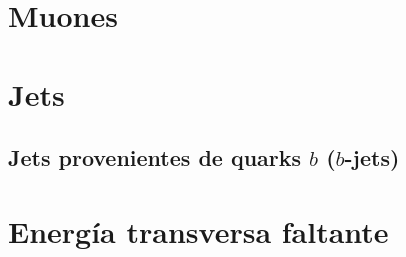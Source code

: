 \section{Muones}

\section{Jets}

\subsection{Jets provenientes de quarks $b$ ($b$-jets)}

\section{Energía transversa faltante}
